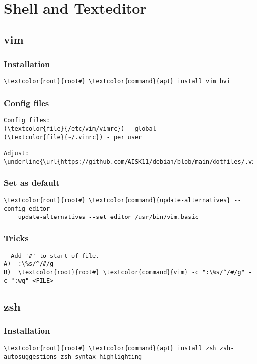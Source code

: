 \documentclass[10pt, a4paper, onecolumn, openany]{book} %
\begin{document}
\chapter{Shell and Texteditor}
\section{vim}
\subsection{Installation}
\begin{Verbatim}[commandchars=\\\{\}]
    \textcolor{root}{root#} \textcolor{command}{apt} install vim bvi
\end{Verbatim}
\subsection{Config files}
\begin{Verbatim}[commandchars=\\\{\}]
Config files:
(\textcolor{file}{/etc/vim/vimrc}) - global
(\textcolor{file}{~/.vimrc}) - per user

Adjust:
\underline{\url{https://github.com/AISK11/debian/blob/main/dotfiles/.vimrc}}
\end{Verbatim}
\subsection{Set as default}
\begin{Verbatim}[commandchars=\\\{\}]
    \textcolor{root}{root#} \textcolor{command}{update-alternatives} --config editor
    update-alternatives --set editor /usr/bin/vim.basic
\end{Verbatim}
\subsection{Tricks}
\begin{Verbatim}[commandchars=\\\{\}]
- Add '#' to start of file:
A)  :\%s/^/#/g
B)  \textcolor{root}{root#} \textcolor{command}{vim} -c ":\%s/^/#/g" -c ":wq" <FILE>
\end{Verbatim}


\section{zsh}
\subsection{Installation}
\begin{Verbatim}[commandchars=\\\{\}]
    \textcolor{root}{root#} \textcolor{command}{apt} install zsh zsh-autosuggestions zsh-syntax-highlighting
\end{Verbatim}
\end{document}
